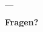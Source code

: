 \begin{frame}
    \frametitle{\_}    

    \begin{center}
        \vspace{2.2cm}
        \Huge{\textbf{Fragen?}}
    \end{center}
\end{frame}
